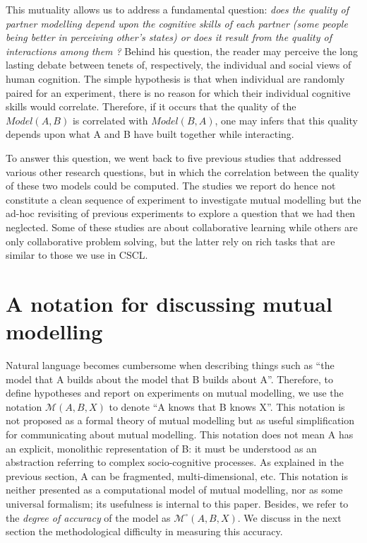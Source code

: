\documentclass[natbib]{svjour3}
\newcommand{\A}{A\xspace}
\newcommand{\B}{B\xspace}
\newcommand{\model}[3]{{$\mathcal{M}(#1, #2, #3)$}}
\newcommand{\Model}[3]{{$\mathcal{M}^{\circ}(#1, #2, #3)$}}
\begin{document}
This mutuality allows us to address a fundamental question: \emph{does the
quality of partner modelling depend upon the cognitive skills of each partner
(some people being better in perceiving other's states) or does it result from
the quality of interactions among them ?} Behind his question, the reader may
perceive the long lasting debate between tenets of, respectively, the individual
and social views of human cognition.  The simple hypothesis is that when
individual are randomly paired for an experiment, there is no reason for which
their individual cognitive skills would correlate. Therefore, if it occurs that
the quality of the $Model(A,B)$ is correlated with $Model(B,A)$, one may infers
that this quality depends upon what \A and \B have built together while
interacting.

To answer this question, we went back to five previous studies that addressed
various other research questions, but in which the correlation between the
quality of these two models could be computed.  The studies we report do hence
not constitute a clean sequence of experiment to investigate mutual modelling but
the ad-hoc revisiting of previous experiments to explore a question that we had
then neglected. Some of these studies are about collaborative learning while
others are only collaborative problem solving, but the latter rely on rich tasks
that are similar to those we use in CSCL.

\section{A notation for discussing mutual modelling }

Natural language becomes cumbersome when describing things such as ``the model
that \A builds about the model that \B builds about A''. Therefore, to define
hypotheses and report on experiments on mutual modelling, we use  the notation
\model{A}{B}{X} to denote ``\A knows that \B knows X''. This  notation is not
proposed as a formal theory of mutual modelling but as useful simplification for
communicating about mutual modelling. This notation does not mean \A has an
explicit, monolithic representation of \B: it must be understood as an
abstraction referring to complex socio-cognitive processes.  As explained in the
previous section, \A can be fragmented, multi-dimensional, etc. This notation
is neither presented as a computational model of mutual modelling, nor as some
universal formalism; its usefulness is internal to this paper.  Besides, we
refer to the \emph{degree of accuracy} of the model as \Model{A}{B}{X}. We
discuss in the next section the methodological difficulty in measuring this
accuracy.
\end{document}
